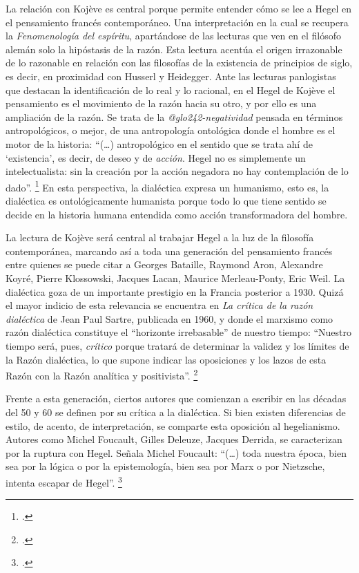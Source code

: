 La relación con Kojève es central porque permite entender cómo se lee a Hegel en el pensamiento francés contemporáneo. Una interpretación en la cual se recupera la \emph{Fenomenología del espíritu}, apartándose de las lecturas que ven en el filósofo alemán solo la hipóstasis de la razón. Esta lectura acentúa el origen irrazonable de lo razonable en relación con las filosofías de la existencia de principios de siglo, es decir, en proximidad con Husserl y Heidegger. Ante las lecturas panlogistas que destacan la identificación de lo real y lo racional, en el Hegel de Kojève el pensamiento es el movimiento de la razón hacia su otro, y por ello es una ampliación de la razón. Se trata de la \emph{\gls{@glo242-negatividad}}  pensada en términos antropológicos, o mejor, de una antropología ontológica donde el hombre es el motor de la historia: \enquote{(\ldots) antropológico en el sentido que se trata ahí de \enquote{existencia}, es decir, de deseo y de \emph{acción}. Hegel no es simplemente un intelectualista: sin la creación por la acción negadora no hay contemplación de lo dado}. \footcite[53]{@6963-KOJEVE1996} En esta perspectiva, la dialéctica expresa un humanismo, esto es, la dialéctica es ontológicamente humanista porque todo lo que tiene sentido se decide en la historia humana entendida como acción transformadora del hombre.


La lectura de Kojève será central al trabajar Hegel a la luz de la filosofía contemporánea, marcando así a toda una generación del pensamiento francés entre quienes se puede citar a Georges Bataille, Raymond Aron, Alexandre Koyré, Pierre Klossowski, Jacques Lacan, Maurice Merleau-Ponty, Eric Weil. La dialéctica goza de un importante prestigio en la Francia posterior a 1930. Quizá el mayor indicio de esta relevancia se encuentra en \emph{La crítica de la razón dialéctica} de Jean Paul Sartre, publicada en 1960, y donde el marxismo como razón dialéctica constituye el \enquote{horizonte irrebasable} de nuestro tiempo: \enquote{Nuestro tiempo será, pues, \emph{crítico} porque tratará de determinar la validez y los límites de la Razón dialéctica, lo que supone indicar las oposiciones y los lazos de esta Razón con la Razón analítica y positivista}. \footcite[11]{@6964-SARTRE1995}


Frente a esta generación, ciertos autores que comienzan a escribir en las décadas del 50 y 60 se definen por su crítica a la dialéctica. Si bien existen diferencias de estilo, de acento, de interpretación, se comparte esta oposición al hegelianismo. Autores como Michel Foucault, Gilles Deleuze, Jacques Derrida, se caracterizan por la ruptura con Hegel. Señala Michel Foucault: \enquote{(\ldots) toda nuestra época, bien sea por la lógica o por la epistemología, bien sea por Marx o por Nietzsche, intenta escapar de Hegel}. \footcite[59]{@6965-FOUCAULT1973}

